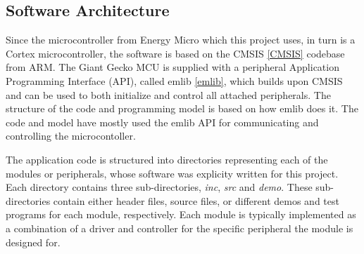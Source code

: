 \subsection{Software Architecture}


Since the microcontroller from Energy Micro which this project uses, in turn is
a Cortex microcontroller, the software is based on the CMSIS \ref{CMSIS}
codebase from ARM. The Giant Gecko MCU is supplied with a peripheral Application
Programming Interface (API), called emlib \ref{emlib}, which builds upon CMSIS
and can be used to both initialize and control all attached peripherals. The
structure of the code and programming model is based on how emlib does it. The
code and model have mostly used the emlib API for communicating and controlling
the microcontoller.



The application code is structured into directories representing each of the
modules or peripherals, whose software was explicity written for this project.
Each directory contains three sub-directories, \textit{inc}, \textit{src} and
\textit{demo}. These sub-directories contain either header files, source files,
or different demos and test programs for each module, respectively. Each module
is typically implemented as a combination of a driver and controller for the
specific peripheral the module is designed for.

